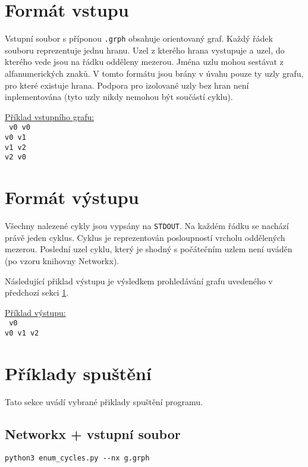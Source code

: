     \section{Formát vstupu}
        \label{sec:input}
        Vstupní soubor s příponou \texttt{.grph} obsahuje orientovaný graf. Každý řádek souboru reprezentuje jednu hranu. Uzel z kterého hrana vystupuje a uzel, do kterého vede jsou na řádku odděleny mezerou. Jména uzlu mohou sestávat z alfanumerických znaků. V tomto formátu jsou brány v úvahu pouze ty uzly grafu, pro které existuje hrana. Podpora pro izolované uzly bez hran není inplementována (tyto uzly nikdy nemohou být součástí cyklu).

        \vspace*{1em}
        \noindent \underline{Příklad vstupního grafu:}
        \vspace*{0.5em}\\
        \noindent\texttt{
            v0 v0\\
            v0 v1\\
            v1 v2\\
            v2 v0
        }

    \section{Formát výstupu}
        Všechny nalezené cykly jsou vypsány na \texttt{STDOUT}. Na každém řádku se nachází právě jeden cyklus. Cyklus je reprezentován posloupností vrcholu oddělených mezerou. Poslední uzel cyklu, který je shodný s počátečním uzlem není uváděn (po vzoru knihovny Networkx).

        Následující přiklad výstupu je výsledkem prohledávání grafu uvedeného v předchozí sekci \ref{sec:input}.

        \vspace*{1em}
        \noindent \underline{Příklad výstupu:}
        \vspace*{0.5em}\\
        \noindent\texttt{
            v0\\
            v0 v1 v2
        }

    \section{Příklady spuštění}
        Tato sekce uvádí vybrané přiklady spuštění programu.

        \subsection*{Networkx + vstupní soubor}
            \texttt{python3 enum\_cycles.py -{}-nx g.grph}

